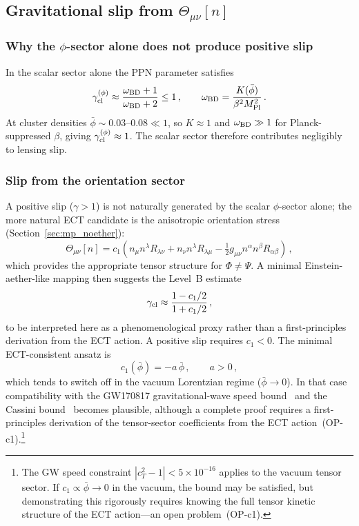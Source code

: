 \documentclass[11pt,a4paper]{article}
\numberwithin{equation}{section}
\begin{document}
\subsection{Gravitational slip from $\Theta_{\mu\nu}[n]$}
\label{app:cluster_slip}

\subsubsection*{Why the $\phi$-sector alone does not produce positive slip}

In the scalar sector alone the PPN parameter satisfies
\begin{equation}
  \gamma_{\rm cl}^{(\phi)} \approx \frac{\omega_{\rm BD}+1}{\omega_{\rm BD}+2}
  \leq 1\,,\qquad
  \omega_{\rm BD} = \frac{K(\bar\phi)}{\beta^2 M_{\rm Pl}^2}\,.
\end{equation}
At cluster densities $\bar\phi\sim0.03$--$0.08\ll1$, so
$K\approx1$ and $\omega_{\rm BD}\gg1$ for Planck-suppressed $\beta$,
giving $\gamma_{\rm cl}^{(\phi)}\approx1$.
The scalar sector therefore contributes negligibly to lensing slip.

\subsubsection*{Slip from the orientation sector}

A positive slip ($\gamma>1$) is not naturally generated by the
scalar $\phi$-sector alone; the more natural ECT candidate is the
anisotropic orientation stress (Section~\ref{sec:mp_noether}):
\begin{equation}
  \Theta_{\mu\nu}[n] = c_1\!\left(
    n_\mu n^\lambda R_{\lambda\nu}
    + n_\nu n^\lambda R_{\lambda\mu}
    - \tfrac{1}{2}g_{\mu\nu}n^\alpha n^\beta R_{\alpha\beta}
  \right)\,,
  \label{eq:Theta_n_cluster}
\end{equation}
which provides the appropriate tensor structure for $\Phi\neq\Psi$.
A minimal Einstein-aether-like mapping then suggests the Level~B
estimate~\cite{Jacobson2004}
\begin{equation}
  \gamma_{\rm cl} \approx \frac{1-c_1/2}{1+c_1/2}\,,
  \label{eq:gamma_Theta}
\end{equation}
to be interpreted here as a phenomenological proxy rather than a
first-principles derivation from the ECT action.
A positive slip requires $c_1<0$.
The minimal ECT-consistent ansatz is
\begin{equation}
  c_1(\bar\phi) = -a\,\bar\phi\,,\qquad a > 0\,,
  \label{eq:c1_ansatz}
\end{equation}
which tends to switch off in the vacuum Lorentzian regime
($\bar\phi\to0$).  In that case compatibility with the
GW170817 gravitational-wave speed
bound~\cite{LIGO_Virgo_GW170817_2017} and the Cassini
bound~\cite{Bertotti2003} becomes plausible, although a complete
proof requires a first-principles derivation of the tensor-sector
coefficients from the ECT action~(OP-c1).\footnote{The GW speed
constraint $|c_T^2-1|<5\times10^{-16}$ applies to the vacuum
tensor sector.  If $c_1\propto\bar\phi\to0$ in the vacuum, the
bound may be satisfied, but demonstrating this rigorously requires
knowing the full tensor kinetic structure of the ECT action---an
open problem~(OP-c1).}
\end{document}
